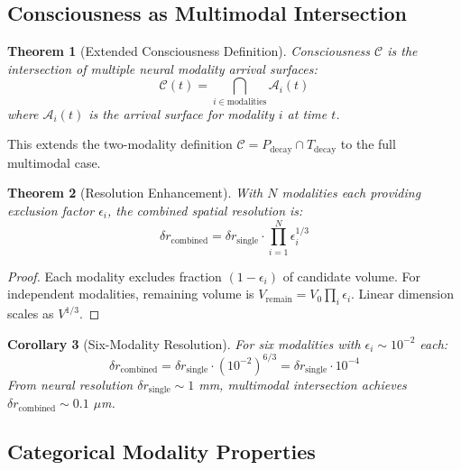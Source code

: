 \documentclass[aps,prd,twocolumn,superscriptaddress,floatfix,nofootinbib]{revtex4-2}
\newtheorem{theorem}{Theorem}[section]
\newtheorem{corollary}[theorem]{Corollary}
\theoremstyle{remark}
\newcommand{\Ccat}{\mathcal{C}}
\newcommand{\Pdecay}{P_{\mathrm{decay}}}
\newcommand{\Tdecay}{T_{\mathrm{decay}}}
\begin{document}
\subsection{Consciousness as Multimodal Intersection}

\begin{theorem}[Extended Consciousness Definition]
\label{thm:extended_consciousness}
Consciousness $\Ccat$ is the intersection of multiple neural modality arrival surfaces:
\begin{equation}
\boxed{\Ccat(t) = \bigcap_{i \in \text{modalities}} \mathcal{A}_i(t)}
\end{equation}
where $\mathcal{A}_i(t)$ is the arrival surface for modality $i$ at time $t$.
\end{theorem}

This extends the two-modality definition $\Ccat = \Pdecay \cap \Tdecay$ to the full multimodal case.

\begin{theorem}[Resolution Enhancement]
\label{thm:resolution_enhance}
With $N$ modalities each providing exclusion factor $\epsilon_i$, the combined spatial resolution is:
\begin{equation}
\delta r_{\text{combined}} = \delta r_{\text{single}} \cdot \prod_{i=1}^N \epsilon_i^{1/3}
\end{equation}
\end{theorem}

\begin{proof}
Each modality excludes fraction $(1-\epsilon_i)$ of candidate volume. For independent modalities, remaining volume is $V_{\text{remain}} = V_0 \prod_i \epsilon_i$. Linear dimension scales as $V^{1/3}$.
\end{proof}

\begin{corollary}[Six-Modality Resolution]
\label{cor:six_modality}
For six modalities with $\epsilon_i \sim 10^{-2}$ each:
\begin{equation}
\delta r_{\text{combined}} = \delta r_{\text{single}} \cdot (10^{-2})^{6/3} = \delta r_{\text{single}} \cdot 10^{-4}
\end{equation}
From neural resolution $\delta r_{\text{single}} \sim 1$ mm, multimodal intersection achieves $\delta r_{\text{combined}} \sim 0.1$ $\mu$m.
\end{corollary}

\subsection{Categorical Modality Properties}
\end{document}
